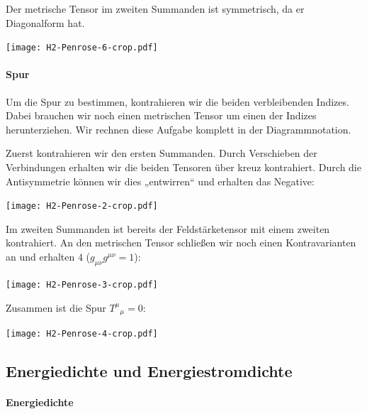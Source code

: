 Der metrische Tensor im zweiten Summanden ist symmetrisch, da er Diagonalform
hat.
\begin{center}
	\texttt{[image: H2-Penrose-6-crop.pdf]}
\end{center}

\paragraph{Spur}

Um die Spur zu bestimmen, kontrahieren wir die beiden verbleibenden Indizes.
Dabei brauchen wir noch einen metrischen Tensor um einen der Indizes
herunterziehen. Wir rechnen diese Aufgabe komplett in der Diagrammnotation.

Zuerst kontrahieren wir den ersten Summanden. Durch Verschieben der
Verbindungen erhalten wir die beiden Tensoren über kreuz kontrahiert. Durch die
Antisymmetrie können wir dies „entwirren“ und erhalten das Negative:
\begin{center}
	\texttt{[image: H2-Penrose-2-crop.pdf]}
\end{center}

Im zweiten Summanden ist bereits der Feldstärketensor mit einem zweiten
kontrahiert. An den metrischen Tensor schließen wir noch einen Kontravarianten
an und erhalten $4$ ($g_{\mu\nu} g^{\mu\nu} = 1$):
\begin{center}
	\texttt{[image: H2-Penrose-3-crop.pdf]}
\end{center}

Zusammen ist die Spur $T^\mu{}_\mu = 0$:
\begin{center}
	\texttt{[image: H2-Penrose-4-crop.pdf]}
\end{center}

\subsection{Energiedichte und Energiestromdichte}

\paragraph{Energiedichte}

